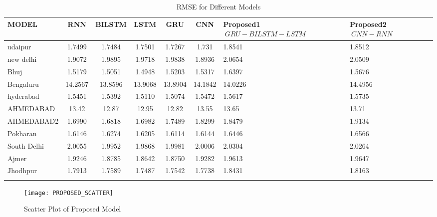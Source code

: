\documentclass[a4paper,fleqn]{cas-sc}
\begin{document}
    \begin{table}[!ht]
    \centering
    \caption{RMSE for Different Models}
    \begin{tabular}{|l|c|c|c|c|c|p{}|p{}|}
    \hline
    \textbf{MODEL} & \textbf{RNN} & \textbf{BILSTM} & \textbf{LSTM} & \textbf{GRU} & \textbf{CNN} &\textbf{Proposed1 \(\ GRU-BILSTM-LSTM \)\ } & \textbf{Proposed2 \(\ CNN-RNN\)\ } \\ \hline
    udaipur & 1.7499 & 1.7484 & 1.7501 & 1.7267 & 1.731 & 1.8541 & 1.8512 \\ \hline
    new delhi & 1.9072 & 1.9895 & 1.9718 & 1.9838 & 1.8936 & 2.0654 & 2.0509 \\ \hline
    Bhuj & 1.5179 & 1.5051 & 1.4948 & 1.5203 & 1.5317 & 1.6397 & 1.5676 \\ \hline
    Bengaluru & 14.2567 & 13.8596 & 13.9068 & 13.8904 & 14.1842 & 14.0226 & 14.4956 \\ \hline
    hyderabad & 1.5451 & 1.5392 & 1.5110 & 1.5074 & 1.5472 & 1.5617 & 1.5735 \\ \hline
    AHMEDABAD & 13.42 & 12.87 & 12.95 & 12.82 & 13.55 & 13.65 & 13.71 \\ \hline
    AHMEDABAD2 & 1.6990 & 1.6818 & 1.6982 & 1.7489 & 1.8299 & 1.8479 & 1.9134 \\ \hline
    Pokharan & 1.6146 & 1.6274 & 1.6205 & 1.6114 & 1.6144 & 1.6446 & 1.6566 \\ \hline
    South Delhi & 2.0055 & 1.9952 & 1.9868 & 1.9981 & 2.0006 & 2.0304 & 2.0264 \\ \hline
    Ajmer & 1.9246 & 1.8785 & 1.8642 & 1.8750 & 1.9282 & 1.9613 & 1.9647 \\ \hline
    Jhodhpur & 1.7913 & 1.7589 & 1.7487 & 1.7542 & 1.7738 & 1.8431 & 1.8163 \\ \hline
    \label{}
    \end{tabular}
    \end{table}




    \begin{figure}[!ht]
      \centering
      \texttt{[image: PROPOSED\_SCATTER]}
      \caption{Scatter Plot of Proposed Model}
      \label{Line plot1}
      \end{figure}
      
\end{document}
